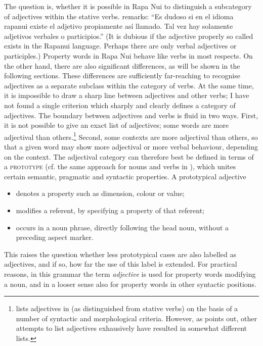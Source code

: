 The question is, whether it is possible in Rapa Nui to distinguish a subcategory of adjectives within the stative verbs. \citet[28]{Englert1978} remarks: “Es dudoso si en el idioma rapanui existe el adjetivo propiamente así llamado. Tal vez hay solamente adjetivos verbales o participios.” (It is dubious if the adjective properly so called exists in the Rapanui language. Perhaps there are only verbal adjectives or participles.) Property words in Rapa Nui behave like verbs in most respects. On the other hand, there are also significant differences, as will be shown in the following sections. These differences are sufficiently far-reaching to recognise adjectives as a separate subclass within the category of verbs. At the same time, it is impossible to draw a sharp line between adjectives and other verbs; I have not found a single criterion which sharply and clearly defines a category of adjectives. The boundary between adjectives and verbs is fluid in two ways. First, it is not possible to give an exact list of adjectives; some words are more adjectival than others.\footnote{\label{fn:120}\citet[8]{Hohepa1969Not} lists adjectives in  (as distinguished from stative verbs) on the basis of a number of syntactic and morphological criteria. However, as \citet[106]{Harlow2007Maori} points out, other attempts to list  adjectives exhausively have resulted in somewhat different lists.} Second, some contexts are more adjectival than others, so that a given word may show more adjectival or more verbal behaviour, depending on the context. The adjectival category can therefore best be defined in terms of a \textsc{prototype} (cf. the same approach for nouns and verbs in ), which unites certain semantic, pragmatic and syntactic properties. A prototypical adjective

\begin{itemize}
\item 
denotes a property such as dimension, colour or value;

\item 
modifies a referent, by specifying a property of that referent;

\item 
occurs in a noun phrase, directly following the head noun, without a preceding aspect marker.

\end{itemize}

This raises the question whether less prototypical cases are also labelled as adjectives, and if so, how far the use of this label is extended. For practical reasons, in this grammar the term \textit{adjective} is used for property words modifying a noun, and in a looser sense also for property words in other syntactic positions.

